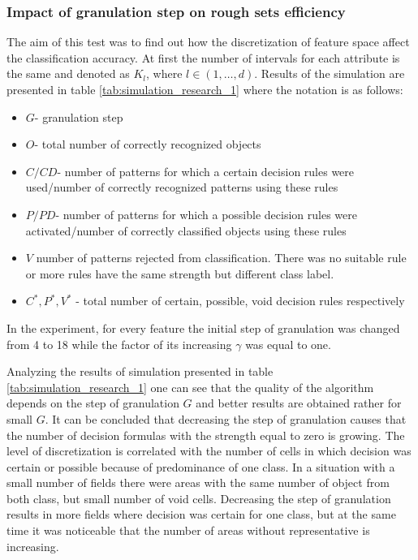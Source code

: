 \subsubsection{Impact of granulation step on rough sets efficiency}
\label{cha:Simulation_reaearch_1}
The aim of this test was to find out how the discretization of feature space
affect the classification accuracy. At first the number of intervals for each
attribute is the same and denoted as $K_l$, where $l \in (1, \ldots, d)$.
Results of the simulation are presented in table
\ref{tab:simulation_research_1} where the notation is as follows:
\begin{itemize}
    \item $G$- granulation step
    \item $O$- total number of correctly recognized objects
    \item $C/CD$- number of patterns for which a certain decision rules were
        used/number of correctly recognized patterns using these rules 
    \item $P/PD$- number of patterns for which a possible decision rules were
        activated/number of correctly classified objects using these rules
    \item $V$ number of patterns rejected from classification. There was no
        suitable rule or more rules have the same strength but different class
        label.
    \item $C^*, P^*, V^*$ - total number of certain, possible, void decision rules 
        respectively
\end{itemize}
In the experiment, for every feature the initial step of granulation was
changed from 4 to 18 while the factor of its increasing $\gamma$  was equal 
to one.

Analyzing the results of simulation presented in table \ref{tab:simulation_research_1}
one can see that the quality of the algorithm depends on the step of
granulation $G$ and better results are obtained rather for small $G$.
It can be concluded that decreasing the step of granulation causes that the number of 
decision formulas with the strength equal to zero is growing. The level of
discretization is correlated with the number of cells in which decision was 
certain or possible because of predominance of one class. In a situation with a small 
number of fields there were areas with the same number of object from both class, but 
small number of void cells. Decreasing the step of granulation results in more fields 
where decision was certain for one class, but at the same time it was noticeable that 
the number of areas without representative is increasing.

